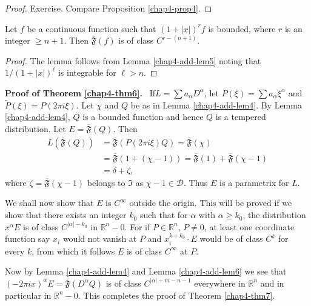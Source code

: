 \begin{proof}
Exercise. Compare Proposition \ref{chap4-prop4}.
\end{proof}

\begin{lemma}\label{chap4-add-lem6}
Let $f$ be a continuous function such that $(1+|x|)^{r}f$ is bounded, where $r$ is an integer $\geq n+1$. Then $\overline{\mathfrak{F}}(f)$ is of class $C^{r-(n+1)}$.
\end{lemma}

\begin{proof}
The lemma follows from Lemma \ref{chap4-add-lem5} noting that $1/(1+|x|)^{\ell}$ is integrable for $\ell>n$.
\end{proof}

\noindent
{\bf Proof of Theorem \ref{chap4-thm6}.}~
If\pageoriginale $L=\sum a_{\alpha}D^{\alpha}$, let $P(\xi)=\sum a_{\alpha}\xi^{\alpha}$ and $\widetilde{P}(\xi)=P(2\pi i\xi)$. Let $\chi$ and $Q$ be as in Lemma \ref{chap4-add-lem4}. By Lemma \ref{chap4-add-lem4}, $Q$ is a bounded function and hence $Q$ is a tempered distribution. Let $E=\overline{\mathfrak{F}}(Q)$. Then
\begin{align*}
L(\overline{\mathfrak{F}}(Q)) &= \overline{\mathfrak{F}}(P(2\pi i\xi)Q)=\overline{\mathfrak{F}}(\chi)\\[4pt]
&= \overline{\mathfrak{F}}(1+(\chi-1))=\overline{\mathfrak{F}}(1)+\overline{\mathfrak{F}}(\chi-1)\\[4pt]
&= \delta+\zeta,
\end{align*}
where $\zeta=\overline{\mathfrak{F}}(\chi-1)$ belongs to $\mathfrak{I}$ as $\chi-1\in \mathcal{D}$. Thus $E$ is a parametrix for $L$.

We shall now show that $E$ is $C^{\infty}$ outside the origin. This will be proved if we show that there exists an integer $k_{0}$ such that for $\alpha$ with $\alpha\geq k_{0}$, the distribution $x^{\alpha}E$ is of class $C^{|\alpha|-k_{0}}$ in $\mathbb{R}^{n}-0$. For if $P\in \mathbb{R}^{n}$, $P\neq 0$, at least one coordinate function say $x_{i}$ would not vanish at $P$ and $x^{k+k_{0}}_{i}\cdot E$ would be of class $C^{k}$ for every $k$, from which it follows $E$ is of class $C^{\infty}$ at $P$.

Now by Lemma \ref{chap4-add-lem4} and Lemma \ref{chap4-add-lem6} we see that $(-2\pi ix)^{\alpha}E=\overline{\mathfrak{F}}(D^{\alpha}Q)$ is of class $C^{|\alpha|+m-n-1}$ everywhere in $\mathbb{R}^{n}$ and in particular in $\mathbb{R}^{n}-0$. This completes the proof of Theorem \ref{chap4-thm7}.

